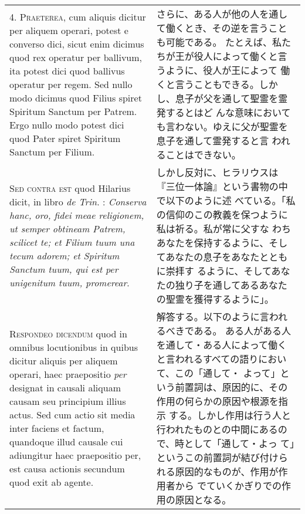 \documentclass[10pt]{jsarticle} %
\begin{document}
\begin{longtable}{p{21em}p{21em}}
\\



4. {\scshape Praeterea}, cum aliquis dicitur per aliquem operari, potest e converso
dici, sicut enim dicimus quod rex operatur per ballivum, ita potest
dici quod ballivus operatur per regem. Sed nullo modo dicimus quod
Filius spiret  Spiritum Sanctum per Patrem. Ergo nullo modo potest
dici quod Pater spiret  Spiritum Sanctum per Filium.

&

さらに、ある人が他の人を通して働くとき、その逆を言うことも可能である。
 たとえば、私たちが王が役人によって働くと言うように、役人が王によって
 働くと言うこともできる。しかし、息子が父を通して聖霊を霊発するとはど
 んな意味においても言わない。ゆえに父が聖霊を息子を通して霊発すると言
 われることはできない。

\\



{\scshape Sed contra est} quod Hilarius dicit, in libro {\itshape de
 Trin}. : {\itshape Conserva hanc,
oro, fidei meae religionem, ut semper obtineam Patrem, scilicet te; et
Filium tuum una tecum adorem; et  Spiritum Sanctum tuum, qui est per
unigenitum tuum, promerear}.

&

しかし反対に、ヒラリウスは『三位一体論』という書物の中で以下のように述
 べている。「私の信仰のこの教義を保つように私は祈る。私が常に父すな
 わちあなたを保持するように、そしてあなたの息子をあなたとともに崇拝す
 るように、そしてあなたの独り子を通してあるあなたの聖霊を獲得するように」。

\\



{\scshape Respondeo dicendum} quod in omnibus locutionibus in quibus dicitur
aliquis per aliquem operari, haec praepositio {\itshape per} designat in causali
aliquam causam seu principium illius actus. Sed cum actio sit media
inter faciens et factum, quandoque illud causale cui adiungitur haec
praepositio per, est causa actionis secundum quod exit ab agente. 

&

解答する。以下のように言われるべきである。
ある人がある人を通して・ある人によって働くと言われるすべての語りにおいて、この「通して・
 よって」という前置詞は、原因的に、その作用の何らかの原因や根源を指示
 する。しかし作用は行う人と行われたものとの中間にあるので、時として「通して・よっ
 て」というこの前置詞が結び付けられる原因的なものが、作用が作用者から
 でていくかぎりでの作用の原因となる。


\end{longtable}
\end{document}
